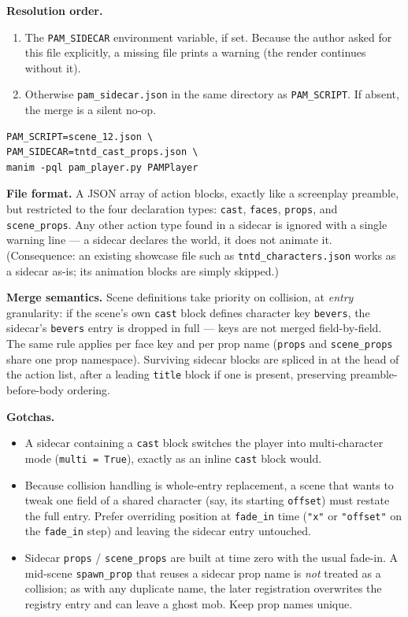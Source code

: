 \documentclass[
  11pt,
]{book}
\begin{document}
\textbf{Resolution order.}

\begin{enumerate}
\item
  The \texttt{PAM\_SIDECAR} environment variable, if set. Because the
  author asked for this file explicitly, a missing file prints a
  warning (the render continues without it).
\item
  Otherwise \texttt{pam\_sidecar.json} in the same directory as
  \texttt{PAM\_SCRIPT}. If absent, the merge is a silent no-op.
\end{enumerate}

\begin{verbatim}
PAM_SCRIPT=scene_12.json \
PAM_SIDECAR=tntd_cast_props.json \
manim -pql pam_player.py PAMPlayer
\end{verbatim}

\textbf{File format.} A JSON array of action blocks, exactly like a
screenplay preamble, but restricted to the four declaration types:
\texttt{cast}, \texttt{faces}, \texttt{props}, and
\texttt{scene\_props}. Any other action type found in a sidecar is
ignored with a single warning line --- a sidecar declares the world, it
does not animate it. (Consequence: an existing showcase file such as
\texttt{tntd\_characters.json} works as a sidecar as-is; its
animation blocks are simply skipped.)

\textbf{Merge semantics.} Scene definitions take priority on
collision, at \emph{entry} granularity: if the scene's own
\texttt{cast} block defines character key \texttt{bevers}, the
sidecar's \texttt{bevers} entry is dropped in full --- keys are not
merged field-by-field. The same rule applies per face key and per prop
name (\texttt{props} and \texttt{scene\_props} share one prop
namespace). Surviving sidecar blocks are spliced in at the head of the
action list, after a leading \texttt{title} block if one is present,
preserving preamble-before-body ordering.

\textbf{Gotchas.}

\begin{itemize}
\item
  A sidecar containing a \texttt{cast} block switches the player into
  multi-character mode (\texttt{multi\ =\ True}), exactly as an inline
  \texttt{cast} block would.
\item
  Because collision handling is whole-entry replacement, a scene that
  wants to tweak one field of a shared character (say, its starting
  \texttt{offset}) must restate the full entry. Prefer overriding
  position at \texttt{fade\_in} time (\texttt{"x"} or
  \texttt{"offset"} on the \texttt{fade\_in} step) and leaving the
  sidecar entry untouched.
\item
  Sidecar \texttt{props} / \texttt{scene\_props} are built at time
  zero with the usual fade-in. A mid-scene \texttt{spawn\_prop} that
  reuses a sidecar prop name is \emph{not} treated as a collision; as
  with any duplicate name, the later registration overwrites the
  registry entry and can leave a ghost mob. Keep prop names unique.
\end{itemize}
\end{document}

